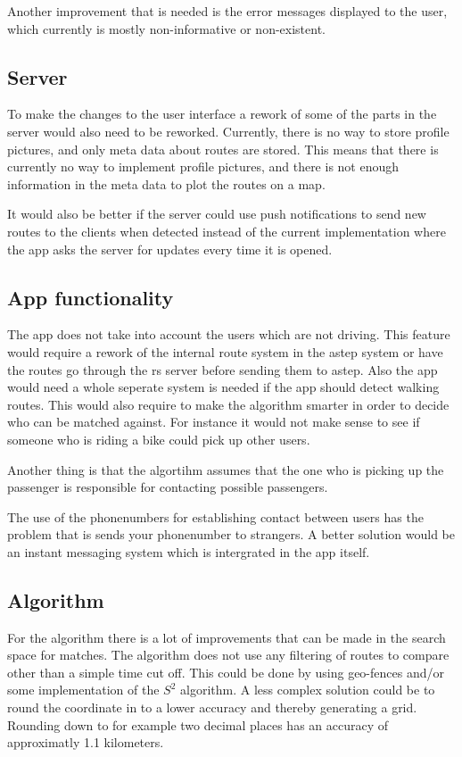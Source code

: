 Another improvement that is needed is the error messages displayed to the user, which currently is mostly non-informative or non-existent.

\subsection{Server}
To make the changes to the user interface a rework of some of the parts in the server would also need to be reworked.
Currently, there is no way to store profile pictures, and only meta data about routes are stored.
This means that there is currently no way to implement profile pictures, and there is not enough information in the meta data to plot the routes on a map.

It would also be better if the server could use push notifications to send new routes to the clients when detected instead of the current implementation where the app asks the server for updates every time it is opened.

\subsection{App functionality}

The app does not take into account the users which are not driving.
This feature would require a rework of the internal route system in the \gls{astep} system or have the routes go through the \gls{rs} server before sending them to \gls{astep}.
Also the app would need a whole seperate system is needed if the app should detect walking routes.
This would also require to make the algorithm smarter in order to decide who can be matched against.
For instance it would not make sense to see if someone who is riding a bike could pick up other users.

Another thing is that the algortihm assumes that the one who is picking up the passenger is responsible for contacting possible passengers.


The use of the phonenumbers for establishing contact between users has the problem that is sends your phonenumber to strangers.
A better solution would be an instant messaging system which is intergrated in the app itself.

\subsection{Algorithm}
For the algorithm there is a lot of improvements that can be made in the search space for matches.
The algorithm does not use any filtering of routes to compare other than a simple time cut off.
This could be done by using geo-fences and/or some implementation of the $S^2$ algorithm.
A less complex solution could be to round the coordinate in to a lower accuracy and thereby generating a grid.
Rounding down to for example two decimal places has an accuracy of approximatly 1.1 kilometers.

